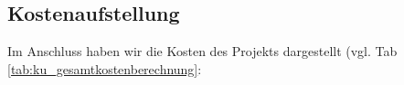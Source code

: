 \subsection{Kostenaufstellung}\label{ku_kosten}
Im Anschluss haben wir die Kosten des Projekts dargestellt (vgl. Tab \ref{tab:ku_gesamtkostenberechnung}: \par

\newpage





